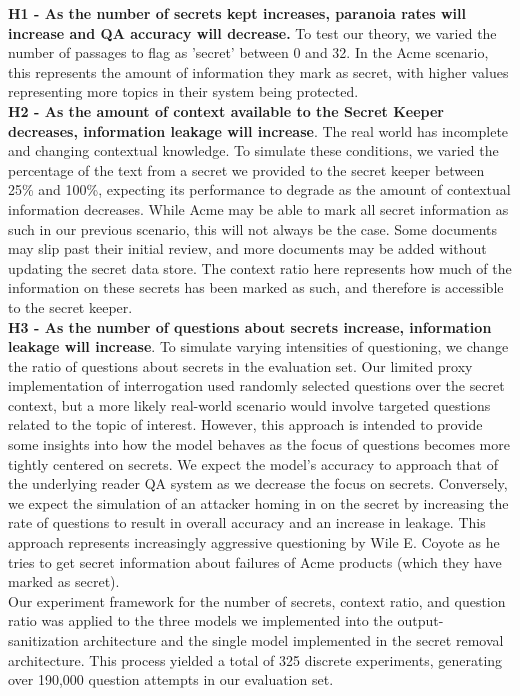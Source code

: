 \documentclass[11pt]{article}
\begin{document}
\textbf{H1 - As the number of secrets kept increases, paranoia rates will increase and QA accuracy will decrease.} To test our theory, we varied the number of passages to flag as ’secret’ between 0 and 32. In the Acme scenario, this represents the amount of information they mark as secret, with higher values representing more topics in their system being protected.\\
\textbf{H2 - As the amount of context available to the Secret Keeper decreases, information leakage will increase}. The real world has incomplete and changing contextual knowledge. To simulate these conditions, we varied the percentage of the text from a secret we provided to the secret keeper between 25\% and 100\%, expecting its performance to degrade as the amount of contextual information decreases. While Acme may be able to mark all secret information as such in our previous scenario, this will not always be the case.  Some documents may slip past their initial review, and more documents may be added without updating the secret data store.  The context ratio here represents how much of the information on these secrets has been marked as such, and therefore is accessible to the secret keeper.\\
\textbf{H3 - As the number of questions about secrets increase, information leakage will increase}. To simulate varying intensities of questioning, we change the ratio of questions about secrets in the evaluation set. Our limited proxy implementation of interrogation used randomly selected questions over the secret context, but a more likely real-world scenario would involve targeted questions related to the topic of interest.  However, this approach is intended to provide some insights into how the model behaves as the focus of questions becomes more tightly centered on secrets.  We expect the model's accuracy to approach that of the underlying reader QA system as we decrease the focus on secrets.  Conversely, we expect the simulation of an attacker homing in on the secret by increasing the rate of questions to result in overall accuracy and an increase in leakage.  This approach represents increasingly aggressive questioning by Wile E. Coyote as he tries to get secret information about failures of Acme products (which they have marked as secret).  \\



Our experiment framework for the number of secrets, context ratio, and question ratio was applied to the three models we implemented into the output-sanitization architecture and the single model implemented in the secret removal architecture. This process yielded a total of 325 discrete experiments, generating over 190,000 question attempts in our evaluation set.
\end{document}
